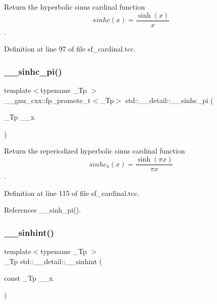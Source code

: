 Return the hyperbolic sinus cardinal function \[ sinhc(x) = \frac{\sinh(x)}{x} \]. 



Definition at line 97 of file sf\+\_\+cardinal.\+tcc.

\mbox{\label{namespacestd_1_1____detail_a3478d06aa615f1efb0fd86fd4eb59195}} 
\subsubsection{\texorpdfstring{\+\_\+\+\_\+sinhc\+\_\+pi()}{\_\_sinhc\_pi()}}
{\footnotesize\ttfamily template$<$typename \+\_\+\+Tp $>$ \\
\+\_\+\+\_\+gnu\+\_\+cxx\+::fp\+\_\+promote\+\_\+t$<$\+\_\+\+Tp$>$ std\+::\+\_\+\+\_\+detail\+::\+\_\+\+\_\+sinhc\+\_\+pi (\begin{DoxyParamCaption}\item[{\+\_\+\+Tp}]{\+\_\+\+\_\+x }\end{DoxyParamCaption})}



Return the reperiodized hyperbolic sinus cardinal function \[ sinhc_\pi(x) = \frac{\sinh(\pi x)}{\pi x} \]. 



Definition at line 115 of file sf\+\_\+cardinal.\+tcc.



References \+\_\+\+\_\+sinh\+\_\+pi().

\mbox{\label{namespacestd_1_1____detail_ac629f9c743a716608af2007d2e34438d}} 
\subsubsection{\texorpdfstring{\+\_\+\+\_\+sinhint()}{\_\_sinhint()}}
{\footnotesize\ttfamily template$<$typename \+\_\+\+Tp $>$ \\
\+\_\+\+Tp std\+::\+\_\+\+\_\+detail\+::\+\_\+\+\_\+sinhint (\begin{DoxyParamCaption}\item[{const \+\_\+\+Tp}]{\+\_\+\+\_\+x }\end{DoxyParamCaption})}



